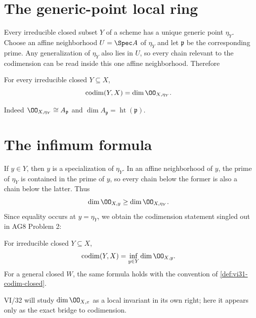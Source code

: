 \section{The generic-point local ring}\label{sec:vi31-generic-local}
Every irreducible closed subset $Y$ of a scheme has a unique generic point $\eta_Y$.  Choose an affine neighborhood
$U=\Spec A$ of $\eta_Y$ and let $\mathfrak p$ be the corresponding prime.  Any generalization of $\eta_Y$ also lies in
$U$, so every chain relevant to the codimension can be read inside this one affine neighborhood.  Therefore
\begin{theorem}\label{thm:vi31-generic-local}
For every irreducible closed $Y\subseteq X$,
\[
 \operatorname{codim}(Y,X)=\dim\OO_{X,\eta_Y}.
\]
\end{theorem}
Indeed $\OO_{X,\eta_Y}\cong A_{\mathfrak p}$ and $\dim A_{\mathfrak p}=\operatorname{ht}(\mathfrak p)$.


\section{The infimum formula}\label{sec:vi31-infimum}
If $y\in Y$, then $y$ is a specialization of $\eta_Y$.  In an affine neighborhood of $y$, the prime of
$\eta_Y$ is contained in the prime of $y$, so every chain below the former is also a chain below the latter.  Thus
\[
 \dim\OO_{X,y}\geq \dim\OO_{X,\eta_Y}.
\]
Since equality occurs at $y=\eta_Y$, we obtain the codimension statement singled out in AG8 Problem 2:
\begin{theorem}\label{thm:vi31-inf-local}
For irreducible closed $Y\subseteq X$,
\[
 \operatorname{codim}(Y,X)=\inf_{y\in Y}\dim\OO_{X,y}.
\]
For a general closed $W$, the same formula holds with the convention of \cref{def:vi31-codim-closed}.
\end{theorem}
VI/32 will study $\dim\OO_{X,x}$ as a local invariant in its own right; here it appears only as the exact bridge to
codimension.


